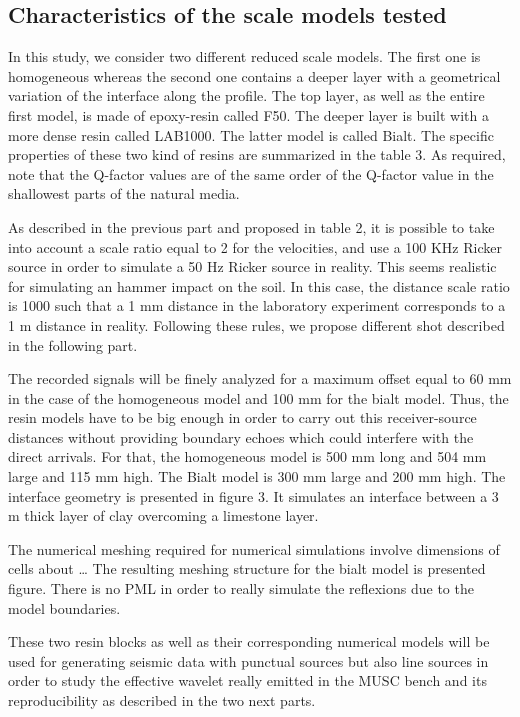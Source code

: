 \documentclass[manuscript,revised]{geophysics}
\begin{document}
\subsection{Characteristics of the scale models tested}

\noindent In this study, we consider two different reduced scale models. The first one is homogeneous whereas the second one contains a deeper layer with a geometrical variation of the interface along the profile. The top layer, as well as the entire first model, is made of epoxy-resin called F50. The deeper layer is built with a more dense resin called LAB1000. The latter model is called Bialt. The specific properties of these two kind of resins are summarized in the table 3. As required, note that the Q-factor values are of the same order of the Q-factor value in the shallowest parts of the natural media.

\noindent As described in the previous part and proposed in table 2, it is possible to take into account a scale ratio equal to 2 for the velocities, and use a 100 KHz Ricker source in order to simulate a 50 Hz Ricker source in reality. This seems realistic for simulating an hammer impact on the soil. In this case, the distance scale ratio is 1000 such that a 1 mm distance in the laboratory experiment corresponds to a 1 m distance in reality. Following these rules, we propose different shot described in the following part. 

\noindent The recorded signals will be finely analyzed for a maximum offset equal to 60 mm in the case of the homogeneous model and 100 mm for the bialt model. Thus, the resin models have to be big enough in order to carry out this receiver-source distances without providing boundary echoes which could interfere with the direct arrivals. For that, the homogeneous model is 500 mm long and 504 mm large and 115 mm high. The Bialt model is 300 mm large and 200 mm high. The interface geometry is presented in figure 3. It simulates an interface between a 3 m thick layer of clay overcoming a limestone layer.

\noindent The numerical meshing required for numerical simulations involve dimensions of cells about … The resulting meshing structure for the bialt model is presented figure.
There is no PML in order to really simulate the reflexions due to the model boundaries.

\noindent These two resin blocks as well as their corresponding numerical models will be used for generating seismic data with punctual sources but also line sources in order to study the effective wavelet really emitted in the MUSC bench and its reproducibility as described in the two next parts.
\end{document}
